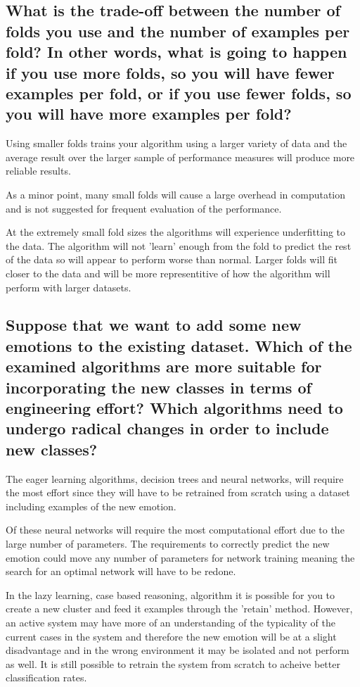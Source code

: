 \documentclass[11pt]{article}
\begin{document}
\subsection{What is the trade-off between the number of folds you use and the number of examples per fold? In other words, what is going to happen if you use more folds, so you will have fewer examples per fold, or if you use fewer folds, so you will have more examples per fold?}

Using smaller folds trains your algorithm using a larger variety of data and the average result over the larger sample of performance measures will produce more reliable results.

As a minor point, many small folds will cause a large overhead in computation and is not suggested for frequent evaluation of the performance. 

At the extremely small fold sizes the algorithms will experience underfitting to the data. The algorithm will not 'learn' enough from the fold to predict the rest of the data so will appear to perform worse than normal. Larger folds will fit closer to the data and will be more representitive of how the algorithm will perform with larger datasets. 

\subsection{Suppose that we want to add some new emotions to the existing dataset. Which of the examined algorithms are more suitable for incorporating the new classes in terms of engineering effort? Which algorithms need to undergo radical changes in order to include new classes?}

The eager learning algorithms, decision trees and neural networks, will require the most effort since they will have to be retrained from scratch using a dataset including examples of the new emotion. 

Of these neural networks will require the most computational effort due to the large number of parameters. The requirements to correctly predict the new emotion could move any number of parameters for network training meaning the search for an optimal network will have to be redone.

In the lazy learning, case based reasoning, algorithm it is possible for you to create a new cluster and feed it examples through the 'retain' method. However, an active system may have more of an understanding of the typicality of the current cases in the system and therefore the new emotion will be at a slight disadvantage and in the wrong environment it may be isolated and not perform as well. It is still possible to retrain the system from scratch to acheive better classification rates.
\end{document}
